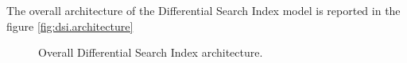 The overall architecture of the Differential Search Index model is reported in the figure \ref{fig:dsi.architecture}



\begin{figure*}
    \centering
    \caption{Overall Differential Search Index architecture.}
    \label{fig:dsi-architecture}
\end{figure*}
